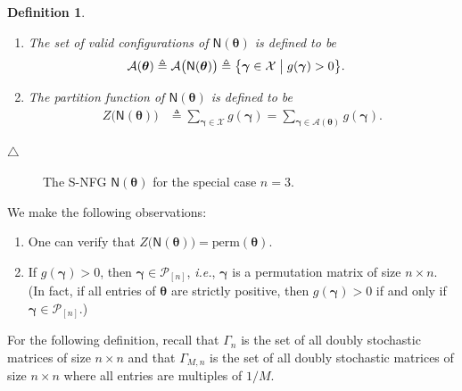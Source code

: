 \documentclass[journal,lettersize,twocolumn]{IEEEtran} %
\newtheorem{definition}[theorem]{Definition}
\newcommand{\edefinition}{\hfill$\triangle$}
\newcommand{\vect}[1]{ \bm{#1} }
\newcommand{\set}[1]{\mathcal{#1}}
\newcommand{\vgam}{ \vect{\gamma} }
\newcommand{\sfN}{ \mathsf{N} }
\newcommand{\matr}[1]{ \bm{#1} }
\newcommand{\defeq}{ \triangleq }
\newcommand{\setX}{ \set{X} }
\newcommand{\perm}{ \mathrm{perm} }
\newcommand{\setP}{\set{P}}
\newcommand{\mtheta}{\matr{\theta}}
\newcommand{\setA}{ \set{A} }
\newcommand{\vgamzo}{\vgam}
\newcommand{\ie}{\textit{i.e.}}
\begin{document}
\begin{definition}
\begin{enumerate}
  \item The set of valid configurations of $ \sfN(\mtheta) $ is
    defined to be
    \begin{align*}
      \setA(\mtheta)
        &\defeq
           \setA\bigl( \sfN(\mtheta) \bigr)
         \defeq 
           \bigl\{
             \vgamzo \in \setX
           \bigm|
             g(\vgamzo) > 0
           \bigr\}.
    \end{align*}
    
  \item The partition function of $ \sfN(\mtheta) $ is defined to be
    \begin{align*}
      Z\bigl( \sfN(\mtheta) \bigr)
        &\defeq 
           \sum_{\vgamzo \in \setX }
             g(\vgamzo)
         = \sum_{\vgamzo \in \setA(\mtheta) }
             g(\vgamzo).
    \end{align*}

  \end{enumerate}
  \vspace{-0.25cm}
  \edefinition
\end{definition}

%

\begin{figure}[t]
  \centering
  
  \caption{The S-NFG $ \sfN(\mtheta) $ for the special case $ n = 3 $.}
  \label{sec:1:fig:15}
  \vspace{-0.0cm}
\end{figure}

%

We make the following observations:
\begin{enumerate}

\item One can verify that $Z\bigl( \sfN(\mtheta) \bigr) = \perm(\mtheta)$.

\item If $ g(\vgamzo) > 0 $, then $ \vgamzo \in \setP_{[n]} $,
  \ie, $\vgamzo$ is a permutation matrix of size $n \times n$. (In
  fact, if all entries of $\mtheta$ are strictly positive, then
  $ g(\vgamzo) > 0 $ if and only if $ \vgamzo \in \setP_{[n]} $.)

\end{enumerate}

%

For the following definition, recall that $\Gamma_{n}$ is the set of all
doubly stochastic matrices of size $n \times n$ and that $\Gamma_{M,n}$ is the
set of all doubly stochastic matrices of size $n \times n$ where all entries
are multiples of $1/M$.
\end{document}
